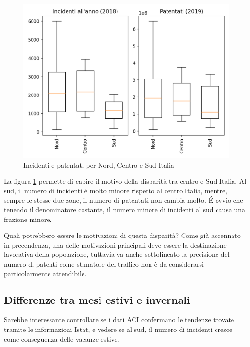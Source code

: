 \documentclass[a4paper]{report}
\begin{document}
\begin{figure}
    \includegraphics[width=\linewidth]{../src/incidenti/incidenti_aci/mappe_regioni/incidenti_patenti_box.png}
    \caption{Incidenti e patentati per Nord, Centro e Sud Italia}
    \label{fig:incidenti-patentati-box}
\end{figure}

La figura \ref{fig:incidenti-patentati-box} permette di capire il motivo della disparità 
tra centro e Sud Italia.
Al sud, il numero di incidenti è molto minore rispetto al centro Italia, mentre, 
sempre le stesse due zone, il numero di patentati non cambia molto. 
\'E ovvio che tenendo il denominatore costante, il numero minore di incidenti al 
sud causa una frazione minore.

Quali potrebbero essere le motivazioni di questa disparità?
Come già accennato in precendenza, una delle motivazioni principali 
deve essere la destinazione lavorativa della popolazione, tuttavia va anche sottolineato 
la precisione del numero di patenti come stimatore del traffico non è da considerarsi 
particolarmente attendibile.

\subsection{Differenze tra mesi estivi e invernali}

Sarebbe interessante controllare se i dati ACI confermano le tendenze trovate tramite 
le informazioni Istat, e vedere se al sud, il numero di incidenti cresce 
come conseguenza delle vacanze estive.
\end{document}
